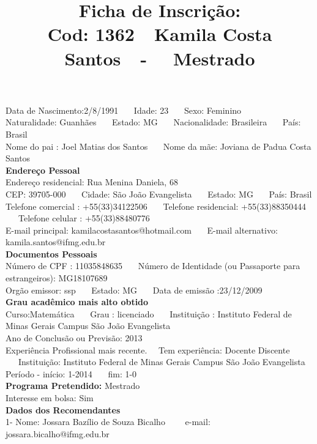 \documentclass[11pt]{article}
\title{\vspace*{-4cm} Ficha de Inscrição: \\Cod: 1362\ \ Kamila Costa Santos\ \ - \ \ Mestrado 
 }
\date{}
\begin{document}
\maketitle
\vspace*{-1.5cm}
\noindent Data de Nascimento:2/8/1991
\ \ \ Idade: 23   \ \ \ Sexo: Feminino
\\
Naturalidade: Guanhães  
\ \ \  Estado: MG
\ \ \  Nacionalidade: Brasileira
\ \ \ País: Brasil
\\        
Nome do pai : Joel Matias dos Santos
\ \ \ Nome da mãe: Joviana de Padua Costa Santos          
\\[0.2cm]                     
\textbf{Endereço Pessoal} 
\\ 
\noindent Endereço residencial: Rua Menina Daniela, 68
\\
        CEP: 39705-000 
\ \ \ Cidade: São João Evangelista 
\ \ \ Estado: MG 
\ \ \ País: Brasil
\\		
		Telefone comercial : +55(33)34122506
\ \ \ Telefone residencial: +55(33)88350444
\ \ \ Telefone celular : +55(33)88480776
\\
E-mail principal: kamilacostasantos@hotmail.com
\ \ \ E-mail alternativo: kamila.santos@ifmg.edu.br 
\\[0.2cm] 
\textbf{Documentos Pessoais}
\\
\noindent Número de CPF : 11035848635
\ \ \ Número de Identidade (ou Passaporte para estrangeiros): MG18107689
\\
Orgão emissor: ssp
\ \ \ Estado: MG
\ \ \ Data de emissão :23/12/2009
\\[0.3cm]
\textbf{Grau acadêmico mais alto obtido}
\\	
Curso:Matemática
\ \ \ Grau : licenciado
\ \ \ Instituição : Instituto Federal de Minas Gerais Campus São João Evangelista
\\			
Ano de Conclusão ou Previsão: 2013
\\ 
Experiência Profissional mais recente. \ \  
Tem experiência: Docente Discente  
\ \ \ Instituição: Instituto Federal de Minas Gerais Campus São João Evangelista
\\  
Período - início: 1-2014
\ \ \ fim: 1-0
\\[0.2cm] 
\textbf{Programa Pretendido:} Mestrado\\
Interesse em bolsa: Sim
\\[0.3cm]		
\textbf{Dados dos Recomendantes} 
\\
1- Nome: Jossara Bazílio de Souza Bicalho
\ \ \ \  e-mail: jossara.bicalho@ifmg.edu.br 
\\
\end{document}
